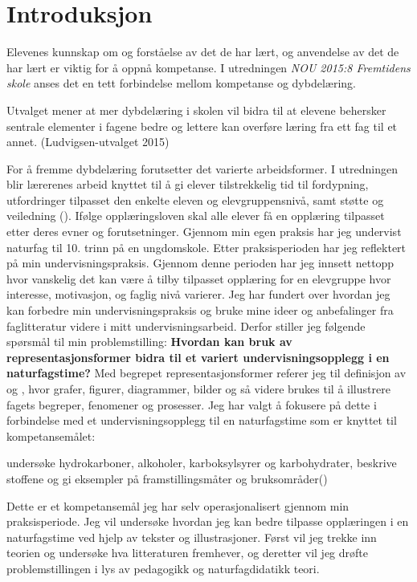 \documentclass[main.tex]{subfiles}
\begin{document}
\section*{Introduksjon}

Elevenes kunnskap om og forståelse av det de har lært, og anvendelse av det de har lært er viktig for å oppnå kompetanse. I utredningen \emph{NOU 2015:8 Fremtidens skole} anses det en tett forbindelse mellom kompetanse og dybdelæring.
\begin{displayquote}
Utvalget mener at mer dybdelæring i skolen vil bidra til at elevene behersker sentrale elementer i fagene bedre og lettere kan overføre læring fra ett fag til et annet. (Ludvigsen-utvalget 2015)
\end{displayquote}
For å fremme dybdelæring forutsetter det varierte arbeidsformer. I utredningen blir lærerenes arbeid knyttet til å gi elever tilstrekkelig tid til fordypning, utfordringer tilpasset den enkelte eleven og elevgruppensnivå, samt støtte og veiledning ().
\newline\newline
Ifølge opplæringsloven skal alle elever få en opplæring tilpasset etter deres evner og forutsetninger. Gjennom min egen praksis har jeg undervist naturfag til 10. trinn på en ungdomskole. Etter praksisperioden har jeg reflektert på min undervisningspraksis. Gjennom denne perioden har jeg innsett nettopp hvor vanskelig det kan være å tilby tilpasset opplæring for en elevgruppe hvor interesse, motivasjon, og faglig nivå varierer. Jeg har fundert over hvordan jeg kan forbedre min undervisningspraksis og bruke mine ideer og anbefalinger fra faglitteratur videre i mitt undervisningsarbeid. Derfor stiller jeg følgende spørsmål til min \mbox{problemstilling:}
\newline\newline
\textbf{Hvordan kan bruk av representasjonsformer bidra til et variert undervisningsopplegg i en naturfagstime?}
\newline\newline
Med begrepet representasjonsformer referer jeg til definisjon av  og , hvor grafer, figurer, diagrammer, bilder og så videre brukes til å illustrere fagets begreper, fenomener og prosesser. Jeg har valgt å fokusere på dette i forbindelse med et undervisningsopplegg til en naturfagstime som er knyttet til kompetansemålet:
\begin{displayquote}
undersøke hydrokarboner, alkoholer, karboksylsyrer og karbohydrater, beskrive stoffene og gi eksempler på framstillingsmåter og bruksområder\newline ()
\end{displayquote}
Dette er et kompetansemål jeg har selv operasjonalisert gjennom min praksisperiode. Jeg vil undersøke hvordan jeg kan bedre tilpasse opplæringen i en naturfagstime ved hjelp av tekster og illustrasjoner. Først vil jeg trekke inn teorien og undersøke hva litteraturen fremhever, og deretter vil jeg drøfte problemstillingen i lys av pedagogikk og naturfagdidatikk teori. 
\end{document}

